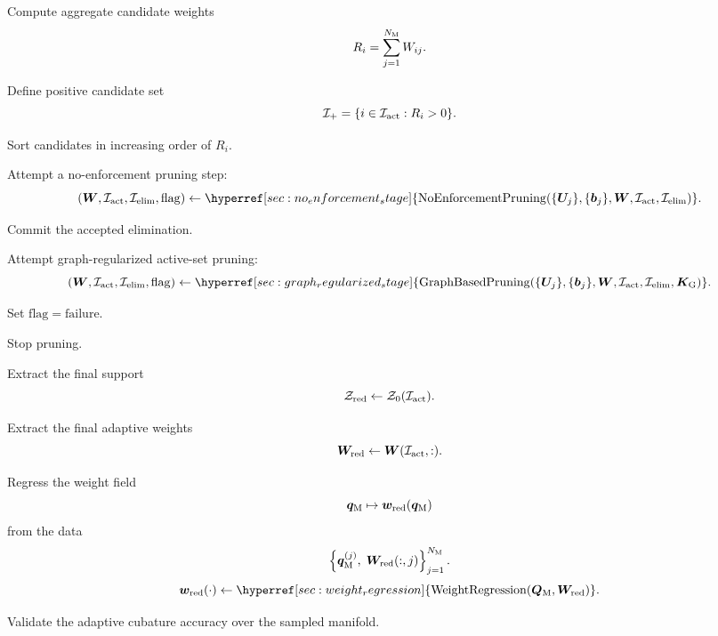 \documentclass[11pt,a4paper]{article}
\begin{document}
\begin{algorithm}[H]
\begin{algorithmic}[1]

    \State Compute aggregate candidate weights
    \[
        R_i = \sum_{j=1}^{N_{\mathrm{M}}} W_{ij}.
    \]

    \State Define positive candidate set
    \[
        \mathcal{I}_{+}=\{i\in\mathcal{I}_{\mathrm{act}}: R_i>0\}.
    \]

    \State Sort candidates in increasing order of $R_i$.

    \State Attempt a no-enforcement pruning step:
    \[
        (\Wadapt,\Iact,\Ielim,\mathrm{flag})
        \gets
        \hyperref[sec:no_enforcement_stage]{\mathrm{NoEnforcementPruning}
        (\{\Uj\},\{\bj\},\Wadapt,\Iact,\Ielim)}.
    \]


        \State Commit the accepted elimination.

    \Else


            \State Attempt graph-regularized active-set pruning:
            \[
                (\Wadapt,\Iact,\Ielim,\mathrm{flag})
                \gets
                \hyperref[sec:graph_regularized_stage]{\mathrm{GraphBasedPruning}
                (\{\Uj\},\{\bj\},\Wadapt,\Iact,\Ielim,\Kgraph)}.
            \]

        \Else

            \State Set $\mathrm{flag}=\mathrm{failure}$.

        \EndIf

            \State Stop pruning.
        \EndIf

    \EndIf

\EndWhile

\State Extract the final support
\[
        \mathcal{Z}_{\mathrm{red}} \gets \mathcal{Z}_{0}(\mathcal{I}_{\mathrm{act}}).
\]

\State Extract the final adaptive weights
\[
        \bm W_{\mathrm{red}}
        \gets
        \bm W(\mathcal{I}_{\mathrm{act}},:).
\]

\State Regress the weight field
\[
        \bm q_{\mathrm{M}} \mapsto \bm w_{\mathrm{red}}(\bm q_{\mathrm{M}})
\]
from the data
\[
        \left\{
        \bm q_{\mathrm{M}}^{(j)},\;
        \bm W_{\mathrm{red}}(:,j)
        \right\}_{j=1}^{N_{\mathrm{M}}}.
\]
\[
        \wred(\cdot)
        \gets
        \hyperref[sec:weight_regression]{\mathrm{WeightRegression}
        (\Qman,\Wadapt_{\mathrm{red}})}.
\]

\State Validate the adaptive cubature accuracy over the sampled manifold.

\end{algorithmic}
\end{algorithm}
\end{document}
